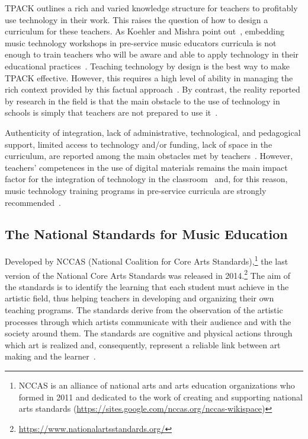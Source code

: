 \documentclass[10pt,journal,compsoc]{IEEEtran}
\begin{document}
TPACK outlines a rich and varied knowledge structure for teachers to profitably use technology in their work. This raises the question of how to design a curriculum for these teachers.
As Koehler and Mishra point out~\cite{koehler2005happens}, embedding music technology workshops in pre-service music educators curricula is not enough to train teachers who will be aware and able to apply technology in their educational practices~\cite{brand1998research, duran2006technology, haning2016they}. 
Teaching technology by design is the best way to make TPACK effective. However, this requires a high level of ability in managing the rich context provided by this factual approach~\cite{koehler2009technological}. By contrast, the reality reported by research in the field is that the main obstacle to the use of technology in schools is simply that teachers are not prepared to use it~\cite{dorfman2016exploring}. 

Authenticity of integration, lack of administrative, technological, and pedagogical support, limited access to technology and/or funding, lack of space in the curriculum, are reported among the main obstacles met by teachers~\cite{bakir2015exploration, bauer2016technology, dorfman2016music, eyles2018teachers}. However, teachers' competences in the use of digital materials remains the main impact factor for the integration of technology in the classroom~\cite{trainin2018impact, wise2011teachers} and, for this reason, music technology training programs in pre-service curricula are strongly recommended~\cite{bakir2015exploration}.



\subsection{The National Standards for Music Education}
\label{subsec:3AP}
Developed by NCCAS (National Coalition for Core Arts Standards),\footnote{NCCAS is an alliance of national arts and arts education organizations who formed in 2011 and dedicated to the work of creating and supporting national arts standards (\url{https://sites.google.com/nccas.org/nccas-wikispace})} the last version of the National Core Arts Standards was released in 2014.\footnote{\url{https://www.nationalartsstandards.org/}} The aim of the standards is to identify the learning that each student must achieve in the artistic field, thus helping teachers in developing and organizing their own teaching programs. The standards derive from the observation of the artistic processes through which artists communicate with their audience and with the society around them. The standards are  cognitive and physical actions through which art is realized and, consequently, represent a reliable link between art making and the learner~\cite{NCCAS}. 
\end{document}
